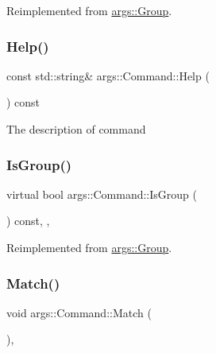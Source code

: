 Reimplemented from \hyperlink{classargs_1_1_group_a3d976f35f65ed8e4908eb88ce84accd4}{args\+::\+Group}.

\mbox{\label{classargs_1_1_command_a120a9143ffb5623db08c07564e1529fc}} 
\subsubsection{\texorpdfstring{Help()}{Help()}}
{\footnotesize\ttfamily const std\+::string\& args\+::\+Command\+::\+Help (\begin{DoxyParamCaption}{ }\end{DoxyParamCaption}) const\hspace{0.3cm}{\ttfamily [inline]}}

The description of command \mbox{\label{classargs_1_1_command_acc75daa42b98b9be35718f072a46f13a}} 
\subsubsection{\texorpdfstring{Is\+Group()}{IsGroup()}}
{\footnotesize\ttfamily virtual bool args\+::\+Command\+::\+Is\+Group (\begin{DoxyParamCaption}{ }\end{DoxyParamCaption}) const\hspace{0.3cm}{\ttfamily [inline]}, {\ttfamily [override]}, {\ttfamily [virtual]}}



Reimplemented from \hyperlink{classargs_1_1_group_a60de0a1db5be506a8638af0d3ce329bc}{args\+::\+Group}.

\mbox{\label{classargs_1_1_command_a9a7ba5cc30681d7f5316d533637a21ba}} 
\subsubsection{\texorpdfstring{Match()}{Match()}\hspace{0.1cm}{\footnotesize\ttfamily [1/2]}}
{\footnotesize\ttfamily void args\+::\+Command\+::\+Match (\begin{DoxyParamCaption}{ }\end{DoxyParamCaption})\hspace{0.3cm}{\ttfamily [inline]}, {\ttfamily [noexcept]}}

